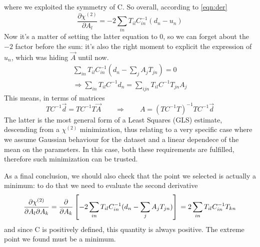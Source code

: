 \documentclass[a4paper,11pt,fleqn]{article}
\begin{document}
where we exploited the symmetry of C. So overall, according to \ref{eqn:der}
\begin{equation*}
    \frac{\partial \chi^{(2)}}{\partial A_l} = -2 \sum_{in}T_{il}C^{-1}_{in}(d_n-u_n)
\end{equation*}
Now it's a matter of setting the latter equation to 0, so we can forget about 
the $-2$ factor before the sum: it's also the right 
moment to explicit the expression of $u_n$, which was hiding $\vec{A}$
until now.
\begin{gather*}
    \sum_{in}T_{il}C^{-1}_{in}(d_n-\sum_j A_j T_{jn}) = 0 \\
    \Rightarrow \sum_{in}T_{il}C^{-1}d_n = \sum_{ijn}T_{il}C^{-1}T_{jn}A_j
\end{gather*}
This means, in terms of matrices
\begin{equation}
    \label{eqn:GLS}
    TC^{-1}\vec{d}=TC^{-1}T\vec{A} \qquad \Rightarrow \qquad A = (TC^{-1}T)^{-1}TC^{-1}\vec{d}
\end{equation}
The latter is the most general form of a Least Squares (GLS) estimate, 
descending from a $\chi^{(2)}$ minimization, thus relating to a very specific 
case where we assume Gaussian behaviour for the dataset and a linear dependece 
of the mean on the parameters. In this case, both these requirements are 
fulfilled, therefore such minimization can be trusted.

\medskip

As a final conclusion, we should also check that the point we selected is actually a minimum: to 
do that we need to evaluate the second derivative 
\begin{equation*}
    \frac{\partial \chi^{(2)}}{\partial A_l \partial A_k} = \frac{\partial}{\partial A_k}\left[-2 \sum_{in}T_{il}C^{-1}_{in}(d_n-\sum_j A_j T_{jn})\right]\\ 
    = 2\sum_{in}T_{il}C^{-1}_{in}T_{kn}
\end{equation*}
and since C is positively defined, this quantity is always positive. The 
extreme point we found must be a minimum.
\end{document}
